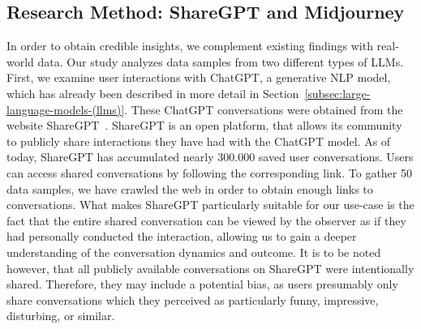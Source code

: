 \subsection{Research Method: ShareGPT and Midjourney}
\label{subsec:research-method:-sharegpt-and-midjourney}
In order to obtain credible insights, we complement existing findings with real-world data.
Our study analyzes data samples from two different types of
LLMs.
First, we examine user interactions with ChatGPT, a generative NLP model, which has already been
described in more detail in Section~\ref{subsec:large-language-models-(llms)}.
These ChatGPT conversations were obtained from the website ShareGPT~\cite{sharegpt_sharegpt_2023}.
ShareGPT is an open platform, that allows its community to publicly share interactions they have
had with the ChatGPT model.
As of today, ShareGPT has accumulated nearly 300.000 saved user conversations.
Users can access shared conversations by following the corresponding link.
To gather 50 data samples, we have crawled the web in order to obtain enough links to conversations.
What makes ShareGPT particularly suitable for our use-case is the fact that the entire shared conversation
can be viewed by the observer as if they had personally conducted the interaction, allowing us to
gain a deeper understanding of the conversation dynamics and outcome.
It is to be noted however, that all publicly available conversations on ShareGPT were
intentionally shared.
Therefore, they may include a potential bias, as users presumably only share conversations which
they perceived as particularly funny, impressive, disturbing, or similar.
\newline

